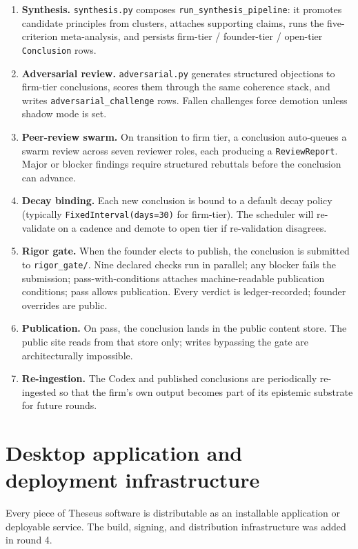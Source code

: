 \documentclass[11pt,letterpaper]{article}
\newcommand{\mod}[1]{\texttt{#1}}
\newcommand{\file}[1]{\texttt{#1}}
\begin{document}
\begin{enumerate}[leftmargin=1.5em,itemsep=0.3em]
  \item \textbf{Synthesis.} \mod{synthesis.py} composes \texttt{run\_synthesis\_pipeline}: it promotes candidate principles from clusters, attaches supporting claims, runs the five-criterion meta-analysis, and persists firm-tier / founder-tier / open-tier \texttt{Conclusion} rows.
  \item \textbf{Adversarial review.} \mod{adversarial.py} generates structured objections to firm-tier conclusions, scores them through the same coherence stack, and writes \texttt{adversarial\_challenge} rows. Fallen challenges force demotion unless shadow mode is set.
  \item \textbf{Peer-review swarm.} On transition to firm tier, a conclusion auto-queues a swarm review across seven reviewer roles, each producing a \texttt{ReviewReport}. Major or blocker findings require structured rebuttals before the conclusion can advance.
  \item \textbf{Decay binding.} Each new conclusion is bound to a default decay policy (typically \texttt{FixedInterval(days=30)} for firm-tier). The scheduler will re-validate on a cadence and demote to open tier if re-validation disagrees.
  \item \textbf{Rigor gate.} When the founder elects to publish, the conclusion is submitted to \file{rigor\_gate/}. Nine declared checks run in parallel; any blocker fails the submission; pass-with-conditions attaches machine-readable publication conditions; pass allows publication. Every verdict is ledger-recorded; founder overrides are public.
  \item \textbf{Publication.} On pass, the conclusion lands in the public content store. The public site reads from that store only; writes bypassing the gate are architecturally impossible.
  \item \textbf{Re-ingestion.} The Codex and published conclusions are periodically re-ingested so that the firm's own output becomes part of its epistemic substrate for future rounds.
\end{enumerate}

\section{Desktop application and deployment infrastructure}

Every piece of Theseus software is distributable as an installable application or deployable service. The build, signing, and distribution infrastructure was added in round 4.
\end{document}
